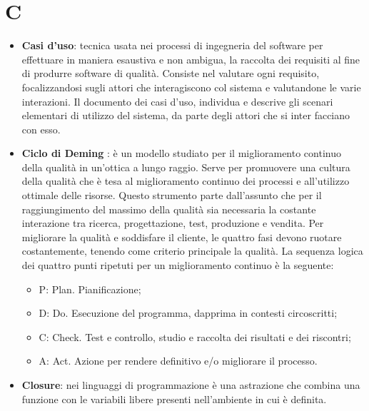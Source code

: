 % 
%
% 
%

\section{C}

\begin{itemize}
	\item \textbf{Casi d'uso}: tecnica usata nei processi di ingegneria del software per effettuare in maniera esaustiva e non ambigua, la raccolta dei requisiti al fine di produrre software di qualità. Consiste nel valutare ogni requisito, focalizzandosi sugli attori che interagiscono col sistema e valutandone le varie interazioni. Il documento dei casi d’uso, individua e descrive gli scenari elementari di utilizzo del sistema, da parte degli attori che si inter facciano con esso.

	\item \textbf{Ciclo di Deming} : è un modello studiato per il miglioramento continuo della qualità in un’ottica a lungo raggio. Serve per promuovere una cultura della qualità che è tesa al miglioramento continuo dei processi e all’utilizzo ottimale delle risorse. Questo strumento parte dall’assunto che per il raggiungimento del massimo della qualità sia necessaria la costante interazione tra ricerca, progettazione, test, produzione e vendita.
Per migliorare la qualità e soddisfare il cliente, le quattro fasi devono ruotare costantemente, tenendo come criterio principale la qualità.
La sequenza logica dei quattro punti ripetuti per un miglioramento continuo è la seguente:
	\begin{itemize}
		\item P: Plan. Pianificazione;
		\item D: Do. Esecuzione del programma, dapprima in contesti circoscritti;
		\item C: Check. Test e controllo, studio e raccolta dei risultati e dei riscontri;
		\item A: Act. Azione per rendere definitivo e/o migliorare il processo.
	\end{itemize}

	\item \textbf{Closure}: nei linguaggi di programmazione è una astrazione che combina una funzione con le variabili libere presenti nell'ambiente in cui è definita. \newline


\end{itemize}
